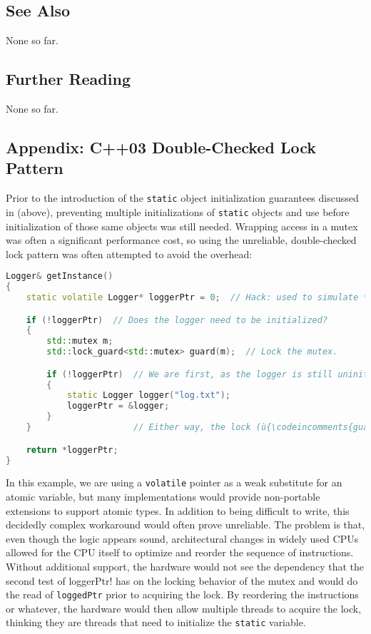 \subsection[See Also]{See Also}\label{see-also}

None so far.

\subsection[Further Reading]{Further Reading}\label{further-reading}

None so far.

\subsection[Appendix: C++03 Double-Checked Lock Pattern]{Appendix: C++03 Double-Checked Lock Pattern}\label{appendix:-c++03-double-checked-lock-pattern}

Prior to the introduction of the  \lstinline!static!
object initialization guarantees discussed in 
(above), preventing multiple initializations of \lstinline!static! objects
and use before initialization of those same objects was still needed.
Wrapping access in a mutex was often a significant performance cost, so
using the unreliable, double-checked lock pattern was often attempted to
avoid the overhead:

\begin{lstlisting}[language=C++]
Logger& getInstance()
{
    static volatile Logger* loggerPtr = 0;  // Hack: used to simulate *atomics*

    if (!loggerPtr)  // Does the logger need to be initialized?
    {
        std::mutex m;
        std::lock_guard<std::mutex> guard(m);  // Lock the mutex.

        if (!loggerPtr)  // We are first, as the logger is still uninitialized.
        {
            static Logger logger("log.txt");
            loggerPtr = &logger;
        }
    }                    // Either way, the lock (ù{\codeincomments{guard}}ù) unlocks the mutex here.

    return *loggerPtr;
}
\end{lstlisting}
    
\noindent In this example, we are using a \lstinline!volatile! pointer as a weak
substitute for an atomic variable, but many implementations would
provide non-portable extensions to support atomic types. In addition to
being difficult to write, this decidedly complex workaround would often
prove unreliable. The problem is that, even though the logic appears
sound, architectural changes in widely used CPUs allowed for the CPU
itself to optimize and reorder the sequence of instructions. Without
additional support, the hardware would not see the dependency that the
second test of \lstinline!!loggerPtr! has on the locking behavior of the
mutex and would do the read of \lstinline!loggedPtr! prior to acquiring the
lock. By reordering the instructions or whatever, the hardware
would then allow multiple threads to acquire the lock, thinking they are
threads that need to initialize the \lstinline!static! variable.

